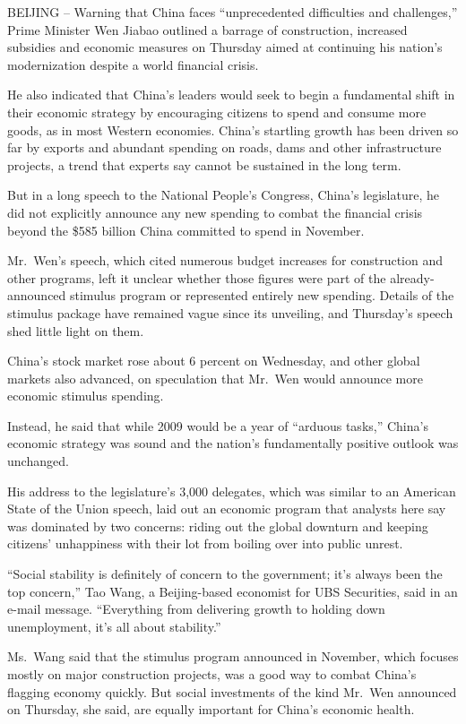 \documentclass[12pt,a4paper,onecolumn]{article}
\begin{document}
\begin{CJK*}{GBK}{song}
BEIJING -- Warning that China faces ``unprecedented difficulties and challenges,'' Prime Minister
Wen Jiabao outlined a barrage of construction, increased subsidies and economic measures on Thursday
aimed at continuing his nation's modernization despite a world financial crisis.

He also indicated that China's leaders would seek to begin a fundamental shift in their economic
strategy by encouraging citizens to spend and consume more goods, as in most Western economies.
China's startling growth has been driven so far by exports and abundant spending on roads, dams and
other infrastructure projects, a trend that experts say cannot be sustained in the long term.

But in a long speech to the National People's Congress, China's legislature, he did not explicitly
announce any new spending to combat the financial crisis beyond the \$585 billion China committed to
spend in November.

Mr.~Wen's speech, which cited numerous budget increases for construction and other programs, left it
unclear whether those figures were part of the already-announced stimulus program or represented
entirely new spending. Details of the stimulus package have remained vague since its unveiling, and
Thursday's speech shed little light on them.

China's stock market rose about 6 percent on Wednesday, and other global markets also advanced, on
speculation that Mr.~Wen would announce more economic stimulus spending.

Instead, he said that while 2009 would be a year of ``arduous tasks,'' China's economic strategy was
sound and the nation's fundamentally positive outlook was unchanged.

His address to the legislature's 3,000 delegates, which was similar to an American State of the
Union speech, laid out an economic program that analysts here say was dominated by two concerns:
riding out the global downturn and keeping citizens' unhappiness with their lot from boiling over
into public unrest.

``Social stability is definitely of concern to the government; it's always been the top concern,''
Tao Wang, a Beijing-based economist for UBS Securities, said in an e-mail message. ``Everything from
delivering growth to holding down unemployment, it's all about stability.''

Ms.~Wang said that the stimulus program announced in November, which focuses mostly on major
construction projects, was a good way to combat China's flagging economy quickly. But social
investments of the kind Mr.~Wen announced on Thursday, she said, are equally important for China's
economic health.


\end{CJK*}
\end{document}

